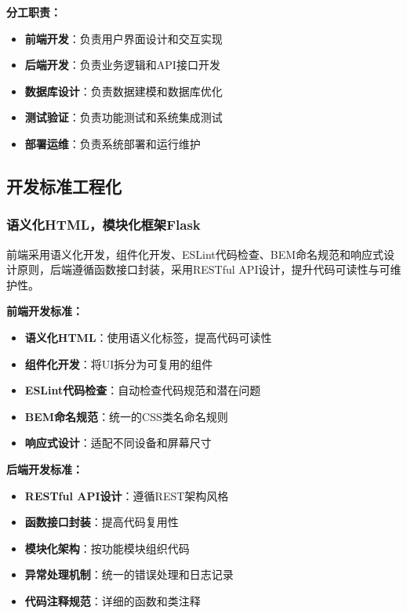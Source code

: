 \documentclass[a4paper]{article}
\begin{document}
\textbf{分工职责：}
\begin{itemize}
    \item \textbf{前端开发}：负责用户界面设计和交互实现
    \item \textbf{后端开发}：负责业务逻辑和API接口开发
    \item \textbf{数据库设计}：负责数据建模和数据库优化
    \item \textbf{测试验证}：负责功能测试和系统集成测试
    \item \textbf{部署运维}：负责系统部署和运行维护
\end{itemize}

\subsection{开发标准工程化}

\subsubsection{语义化HTML，模块化框架Flask}

前端采用语义化开发，组件化开发、ESLint代码检查、BEM命名规范和响应式设计原则，后端遵循函数接口封装，采用RESTful API设计，提升代码可读性与可维护性。

\textbf{前端开发标准：}
\begin{itemize}
    \item \textbf{语义化HTML}：使用语义化标签，提高代码可读性
    \item \textbf{组件化开发}：将UI拆分为可复用的组件
    \item \textbf{ESLint代码检查}：自动检查代码规范和潜在问题
    \item \textbf{BEM命名规范}：统一的CSS类名命名规则
    \item \textbf{响应式设计}：适配不同设备和屏幕尺寸
\end{itemize}

\textbf{后端开发标准：}
\begin{itemize}
    \item \textbf{RESTful API设计}：遵循REST架构风格
    \item \textbf{函数接口封装}：提高代码复用性
    \item \textbf{模块化架构}：按功能模块组织代码
    \item \textbf{异常处理机制}：统一的错误处理和日志记录
    \item \textbf{代码注释规范}：详细的函数和类注释
\end{itemize}
\end{document}
